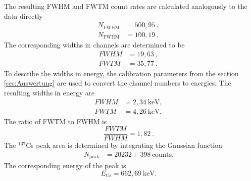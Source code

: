 The resulting FWHM and FWTM count rates are calculated analogously to the data directly
\begin{align*}
    N_{\text{FWHM}} & = 500,95~,\\
    N_{\text{FWHM}} & = 100,19~.    
\end{align*}
The corresponding widths in channels are determined to be
\begin{align*}
    FWHM & = 19,63~,\\
    FWTM & = 35,77~.
\end{align*}
To describe the widths in energy, the calibration parameters from the section \ref{sec:Auswertung} are used to convert the channel numbers to energies.
The resulting widths in energy are
\begin{align*}
    FWHM & = 2,34~ \text{keV},\\
    FWTM & = 4,26~ \text{keV}.
\end{align*}
The ratio of FWTM to FWHM is
\begin{equation*}
    \frac{FWTM}{FWHM} = 1,82~.
\end{equation*}
The $^{137}$Cs peak area is determined by integrating the Gaussian function
\begin{align*}
    N_{\text{peak}} & =  20232 \pm 398 ~\text{counts}.
\end{align*}
The corresponding energy of the peak is
\begin{equation}
    E_{\text{Cs}} = 662,69 ~\text{keV}.
    \label{eq:Cs_energy}
\end{equation}

